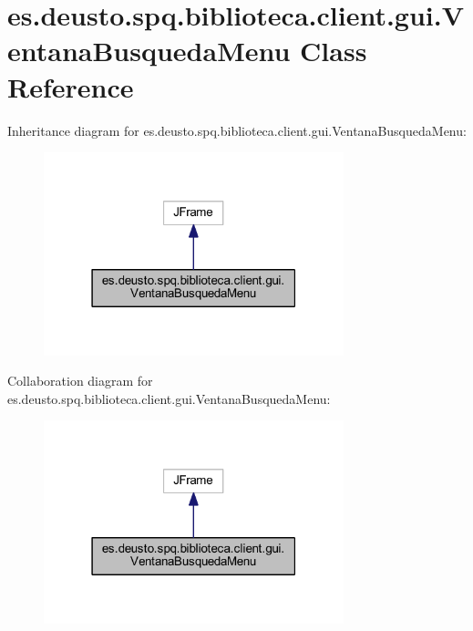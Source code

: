 \hypertarget{classes_1_1deusto_1_1spq_1_1biblioteca_1_1client_1_1gui_1_1_ventana_busqueda_menu}{}\section{es.\+deusto.\+spq.\+biblioteca.\+client.\+gui.\+Ventana\+Busqueda\+Menu Class Reference}
\label{classes_1_1deusto_1_1spq_1_1biblioteca_1_1client_1_1gui_1_1_ventana_busqueda_menu}


Inheritance diagram for es.\+deusto.\+spq.\+biblioteca.\+client.\+gui.\+Ventana\+Busqueda\+Menu\+:
\nopagebreak
\begin{figure}[H]
\begin{center}
\leavevmode
\includegraphics[width=247pt]{classes_1_1deusto_1_1spq_1_1biblioteca_1_1client_1_1gui_1_1_ventana_busqueda_menu__inherit__graph}
\end{center}
\end{figure}


Collaboration diagram for es.\+deusto.\+spq.\+biblioteca.\+client.\+gui.\+Ventana\+Busqueda\+Menu\+:
\nopagebreak
\begin{figure}[H]
\begin{center}
\leavevmode
\includegraphics[width=247pt]{classes_1_1deusto_1_1spq_1_1biblioteca_1_1client_1_1gui_1_1_ventana_busqueda_menu__coll__graph}
\end{center}
\end{figure}
